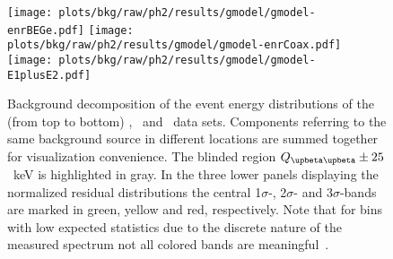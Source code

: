 \begin{sidewaystable}
  \centering
  \footnotesize
  \caption{%
    Summary of the analysis parameter estimates. Global mode and marginalized mode, along
    with its smallest 68\% C.I., are reported as representatives of the posterior
    parameter distribution. The number of reconstructed counts in the fit range and the
    background index at \qbb\ prior active background suppression are listed for each
    component and each analysis data set. The original type of prior distribution is
    marked with \m{[f]} for flat, \m{[g]} for Gaussian and \m{[e]} for exponential.
    ($\,^{\dagger}$ Tetratex\reg-coated) 
  }\label{tab:bkg:raw:ph2:gmodel:results}
\end{sidewaystable}

\begin{figure}
  \centering
  \texttt{[image: plots/bkg/raw/ph2/results/gmodel/gmodel-enrBEGe.pdf]}
  \texttt{[image: plots/bkg/raw/ph2/results/gmodel/gmodel-enrCoax.pdf]}
  \texttt{[image: plots/bkg/raw/ph2/results/gmodel/gmodel-E1plusE2.pdf]}
  \caption{%
    Background decomposition of the event energy distributions of the (from top to bottom)
    \enrBEGeII, \enrCoaxII\ and \enrGeII\ data sets.  Components referring to the same
    background source in different locations are summed together for visualization
    convenience. The blinded region $\qbbM \pm 25$~keV is highlighted in gray. In the
    three lower panels displaying the normalized residual distributions the central
    1$\sigma$-, 2$\sigma$- and 3$\sigma$-bands are marked in green, yellow and red,
    respectively. Note that for bins with low expected statistics due to the discrete
    nature of the measured spectrum not all colored bands are
    meaningful~\cite{Aggarwal2011}.%
  }\label{fig:bkg:raw:ph2:gmodel:results}
\end{figure}

